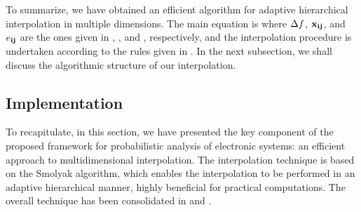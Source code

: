 To summarize, we have obtained an efficient algorithm for adaptive hierarchical
interpolation in multiple dimensions. The main equation is 
where $\Delta f$, $\mathbf{x}_{\mathbf{i}\mathbf{j}}$, and $e_{\mathbf{i}\mathbf{j}}$ are the ones given in
, , and , respectively, and the
interpolation procedure is undertaken according to the rules given in
. In the next subsection, we shall discuss the algorithmic
structure of our interpolation.

\subsection{Implementation} 


To recapitulate, in this section, we have presented the key component of the
proposed framework for probabilistic analysis of electronic systems: an
efficient approach to multidimensional interpolation. The interpolation
technique is based on the Smolyak algorithm, which enables the interpolation to
be performed in an adaptive hierarchical manner, highly beneficial for practical
computations. The overall technique has been consolidated in 
and .
